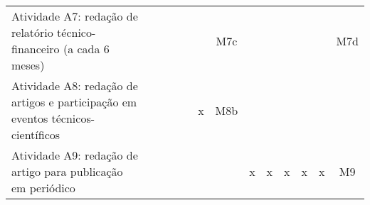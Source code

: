 \begin{table}[!h]
\begin{tabular}{ p{} cccccccccccc}
   Atividade A7: redação de relatório técnico-financeiro (a cada 6 meses)          &    &    &    &    &    & M7c&    &    &    &    &    & M7d\\
   Atividade A8: redação de artigos e participação em eventos técnicos-científicos &    &    &    &    & x  & M8b&    &    &    &    &    &    \\
   Atividade A9: redação de artigo para publicação em periódico                    &    &    &    &    &    &    & x  & x  & x  & x  & x  & M9 \\
\bottomrule
\end{tabular}
	\label{tab:crono}
\end{table}

